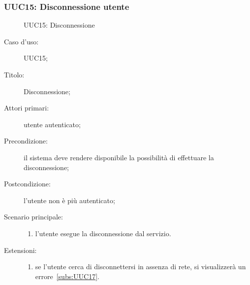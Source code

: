 \documentclass[../../../analisi-dei-requisiti.tex]{subfiles}
\begin{document}
\subsubsection{UUC15: Disconnessione utente}%
\label{subs:UU15}

\begin{figure}[H]
  \centering
  \caption{UUC15: Disconnessione}%
  \label{fig:UUC15}
\end{figure}

\begin{description}
  \item[Caso d'uso:] UUC15;
  \item[Titolo:] Disconnessione;
  \item[Attori primari:] utente autenticato;
  \item[Precondizione:] il sistema deve rendere disponibile la possibilità di effettuare la disconnessione;
  \item[Postcondizione:] l'utente non è più autenticato;
  \item[Scenario principale:]
        \begin{enumerate}
          \item l'utente esegue la disconnessione dal servizio.
        \end{enumerate}
  \item[Estensioni:]
        \begin{enumerate}
          \item se l'utente cerca di disconnettersi in assenza di rete, si visualizzerà un errore~\ref{subs:UUC17}.
        \end{enumerate}
\end{description}
\end{document}
